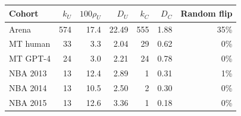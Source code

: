 \begin{tabular}{lrrrrrr}
\toprule
Cohort & $k_U$ & $100\rho_U$ & $D_U$ & $k_C$ & $D_C$ & Random flip \\
\midrule
Arena & 574 & 17.4 & 22.49 & 555 & 1.88 & 35\% \\
MT human & 33 & 3.3 & 2.04 & 29 & 0.62 & 0\% \\
MT GPT-4 & 24 & 3.0 & 2.21 & 24 & 0.78 & 0\% \\
NBA 2013 & 13 & 12.4 & 2.89 & 1 & 0.31 & 1\% \\
NBA 2014 & 13 & 10.5 & 2.50 & 2 & 0.30 & 0\% \\
NBA 2015 & 13 & 12.6 & 3.36 & 1 & 0.18 & 0\% \\
\bottomrule
\end{tabular}
